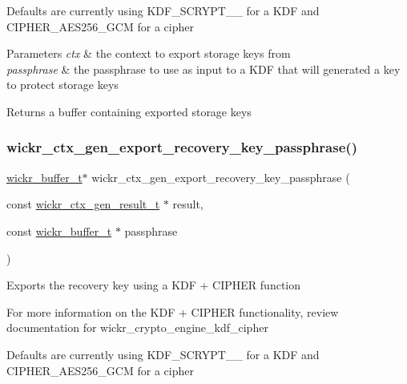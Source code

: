 Defaults are currently using K\+D\+F\+\_\+\+S\+C\+R\+Y\+P\+T\+\_\+\_ for a K\+DF and C\+I\+P\+H\+E\+R\+\_\+\+A\+E\+S256\+\_\+\+G\+CM for a cipher


\begin{DoxyParams}{Parameters}
{\em ctx} & the context to export storage keys from \\
\hline
{\em passphrase} & the passphrase to use as input to a K\+DF that will generated a key to protect storage keys \\
\hline
\end{DoxyParams}
\begin{DoxyReturn}{Returns}
a buffer containing exported storage keys 
\end{DoxyReturn}
\mbox{\label{group__wickr__ctx_ga2dadd40adc0217dd337ee6cf745cbc12}} 
\subsubsection{\texorpdfstring{wickr\+\_\+ctx\+\_\+gen\+\_\+export\+\_\+recovery\+\_\+key\+\_\+passphrase()}{wickr\_ctx\_gen\_export\_recovery\_key\_passphrase()}}
{\footnotesize\ttfamily \mbox{\hyperlink{structwickr__buffer}{wickr\+\_\+buffer\+\_\+t}}$\ast$ wickr\+\_\+ctx\+\_\+gen\+\_\+export\+\_\+recovery\+\_\+key\+\_\+passphrase (\begin{DoxyParamCaption}\item[{const \mbox{\hyperlink{structwickr__ctx__gen__result}{wickr\+\_\+ctx\+\_\+gen\+\_\+result\+\_\+t}} $\ast$}]{result,  }\item[{const \mbox{\hyperlink{structwickr__buffer}{wickr\+\_\+buffer\+\_\+t}} $\ast$}]{passphrase }\end{DoxyParamCaption})}

Exports the recovery key using a K\+DF + C\+I\+P\+H\+ER function

For more information on the K\+DF + C\+I\+P\+H\+ER functionality, review documentation for \textquotesingle{}wickr\+\_\+crypto\+\_\+engine\+\_\+kdf\+\_\+cipher\textquotesingle{}

Defaults are currently using K\+D\+F\+\_\+\+S\+C\+R\+Y\+P\+T\+\_\+\_ for a K\+DF and C\+I\+P\+H\+E\+R\+\_\+\+A\+E\+S256\+\_\+\+G\+CM for a cipher


